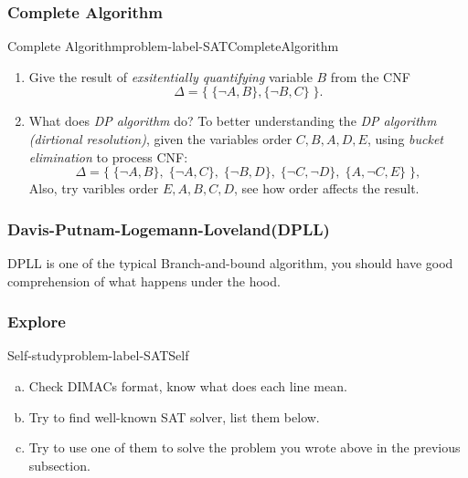 \documentclass[main.tex]{subfiles}
\begin{document}
\subsubsection{Complete Algorithm}
\begin{problem}{Complete Algorithm}{problem-label-SATCompleteAlgorithm}
\begin{enumerate}[(1)]
    \item Give the result of \textit{exsitentially quantifying} variable $B$ from the CNF 
    \[
    \Delta=\{\;\{\neg A,B\},\{\neg B,C\}\;\}.
    \]
    \item What does \textit{DP algorithm} do? To better understanding the \textit{DP algorithm (dirtional resolution)}, given the variables order $C, B, A, D, E$, using \textit{bucket elimination} to process CNF:
    \[
    \Delta=\{\;\{\neg A,B\},\;\{\neg A,C\},\;\{\neg B,D\},\;\{\neg C,\neg D\},\;\{A,\neg C,E\}\;\},
    \]
    Also, try varibles order $E, A, B, C, D$, see how order affects the result.

\end{enumerate}
\end{problem}
\vspace*{4\baselineskip}

\subsubsection{Davis-Putnam-Logemann-Loveland(DPLL)}
DPLL is one of the typical Branch-and-bound algorithm, you should have good comprehension of what happens under the hood.

\subsubsection{Explore}
\begin{problem}{Self-study}{problem-label-SATSelf}
\begin{enumerate}[(a)]
    \item Check DIMACs format, know what does each line mean.
    \item Try to find well-known SAT solver, list them below.
    \item Try to use one of them to solve the problem you wrote above in the previous subsection.
\end{enumerate}
\end{problem}

\vspace*{4\baselineskip}
\end{document}
